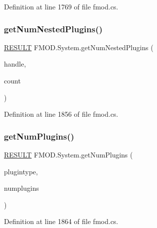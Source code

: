 Definition at line 1769 of file fmod.\+cs.

\mbox{\label{class_f_m_o_d_1_1_system_aef00e8885fd82b48ede707f99592f0fb}} 
\subsubsection{\texorpdfstring{get\+Num\+Nested\+Plugins()}{getNumNestedPlugins()}}
{\footnotesize\ttfamily \hyperlink{namespace_f_m_o_d_a305d1176ef3f8c8815861a60407ac33d}{R\+E\+S\+U\+LT} F\+M\+O\+D.\+System.\+get\+Num\+Nested\+Plugins (\begin{DoxyParamCaption}\item[{uint}]{handle,  }\item[{out int}]{count }\end{DoxyParamCaption})}



Definition at line 1856 of file fmod.\+cs.

\mbox{\label{class_f_m_o_d_1_1_system_a59d69eb21e8735667a3d15482d5e343c}} 
\subsubsection{\texorpdfstring{get\+Num\+Plugins()}{getNumPlugins()}}
{\footnotesize\ttfamily \hyperlink{namespace_f_m_o_d_a305d1176ef3f8c8815861a60407ac33d}{R\+E\+S\+U\+LT} F\+M\+O\+D.\+System.\+get\+Num\+Plugins (\begin{DoxyParamCaption}\item[{\hyperlink{namespace_f_m_o_d_ad838bca9e846c3461c840ea9865dfcea}{P\+L\+U\+G\+I\+N\+T\+Y\+PE}}]{plugintype,  }\item[{out int}]{numplugins }\end{DoxyParamCaption})}



Definition at line 1864 of file fmod.\+cs.

\mbox{\label{class_f_m_o_d_1_1_system_a6e969a761739487018514291d7755a8e}} 
